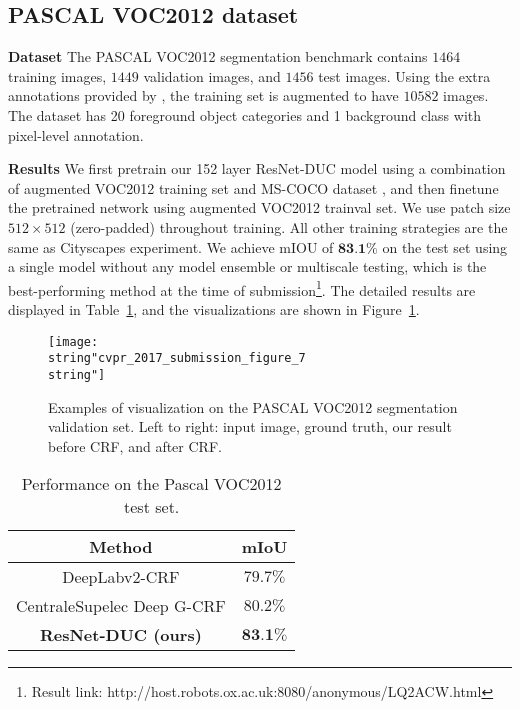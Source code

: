 \documentclass[10pt,twocolumn,letterpaper]{article}
\begin{document}
\subsection{PASCAL VOC2012 dataset}
\textbf{Dataset} The PASCAL VOC2012 segmentation benchmark contains $1464$ training images, $1449$ validation images, and $1456$ test images. Using the extra annotations provided by \cite{hariharan2011semantic}, the training set is augmented to have $10582$ images. The dataset has 20 foreground object categories and 1 background class with pixel-level annotation.

\textbf{Results} We first pretrain our 152 layer ResNet-DUC model using a combination of augmented VOC2012 training set and MS-COCO dataset \cite{lin2014microsoft}, and then finetune the pretrained network using augmented VOC2012 trainval set. We use patch size $512\times 512$ (zero-padded) throughout training. All other training strategies are the same as Cityscapes experiment. We achieve mIOU of $\textbf{83.1\%}$ on the test set using a single model without any model ensemble or multiscale testing, which is the best-performing method at the time of submission\footnote{Result link: http://host.robots.ox.ac.uk:8080/anonymous/LQ2ACW.html}. The detailed results are displayed in Table~\ref{tab:voc}, and the visualizations are shown in Figure~\ref{Figure7_voc}.
\begin{figure}[h]
\begin{center}
\texttt{[image: \\string"cvpr\_2017\_submission\_figure\_7\\string"]}
\end{center}
\caption{Examples of visualization on the PASCAL VOC2012 segmentation validation set. Left to right: input image, ground truth, our result before CRF, and after CRF.}
\label{Figure7_voc}
\vspace{-5pt}
\end{figure}

\begin{table}[ht]
\begin{center}
\begin{tabular}{c|c} \toprule[1.5pt]
    Method & mIoU\\ \midrule
  DeepLabv2-CRF\cite{chen2016deeplab} &	$79.7\%$ \\
  CentraleSupelec Deep G-CRF\cite{chandra2016fast} &	$80.2\%$ \\
  \textbf{ResNet-DUC (ours)} & $\textbf{83.1\%}$ \\ \bottomrule[1.5pt]
\end{tabular}
\vspace{2pt}
\caption{Performance on the Pascal VOC2012 test set.}
\label{tab:voc}
\end{center}
\vspace{-15pt}
\end{table}
\end{document}
